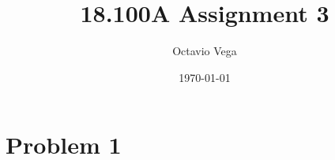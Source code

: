 \documentclass{article}
\title{18.100A Assignment 3}
\author{Octavio Vega}
\date\today
\begin{document}
\maketitle
	
\section*{Problem 1}

	
\end{document}
